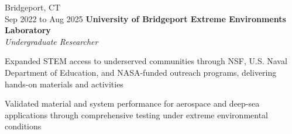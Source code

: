     \vspace{0.20 cm}
    
    \begin{twocolentry}{Bridgeport, CT \\ Sep 2022 to Aug 2025}
        \textbf{University of Bridgeport Extreme Environments Laboratory}\\
        \textit{Undergraduate Researcher}
    \end{twocolentry}

    \vspace{0.10 cm}
    \begin{onecolentry}
        \begin{highlights}
            \item Expanded STEM access to underserved communities through NSF, U.S. Naval Department of Education, and NASA-funded outreach programs, delivering hands-on materials and activities
            \item Validated material and system performance for aerospace and deep-sea applications through comprehensive testing under extreme environmental conditions
        \end{highlights}
    \end{onecolentry}

